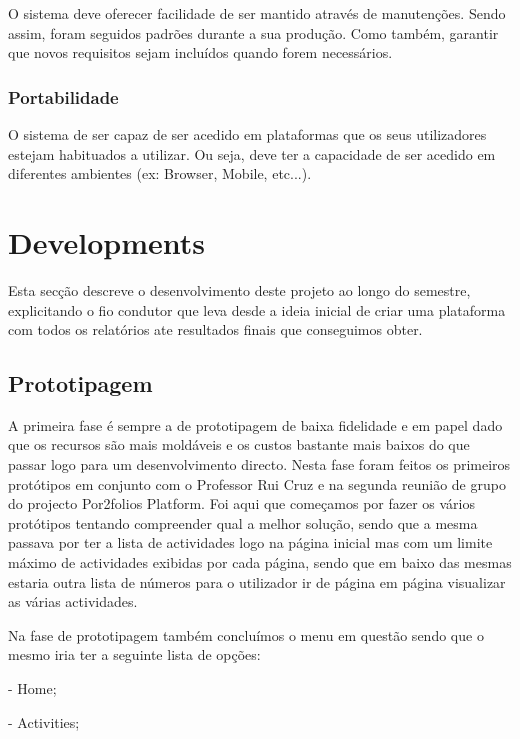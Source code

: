 \documentclass[a4paper,12pt,journal,twoside,compsoc]{PPIEEEtran}
\begin{document}
O sistema deve oferecer facilidade de ser mantido através de manutenções. Sendo assim, foram seguidos padrões durante a sua produção. Como também, garantir que novos requisitos sejam incluídos quando forem necessários.

\subsubsection{Portabilidade}

O sistema de ser capaz de ser acedido em plataformas que os seus utilizadores estejam habituados a utilizar. Ou seja, deve ter a capacidade de ser acedido em diferentes ambientes (ex: Browser, Mobile, etc...). 


\section{Developments}

Esta secção descreve o desenvolvimento deste projeto ao longo do semestre, explicitando o fio condutor que leva desde a ideia inicial de criar uma plataforma com todos os relatórios ate resultados finais que conseguimos obter.

\subsection{Prototipagem}

A primeira fase é sempre a de prototipagem de baixa fidelidade e em papel dado que os recursos são mais moldáveis e os custos bastante mais baixos do que passar logo para um desenvolvimento directo. Nesta fase foram feitos os primeiros protótipos em conjunto com o Professor Rui Cruz e na segunda reunião de grupo do projecto Por2folios Platform. Foi aqui que começamos por fazer os vários protótipos tentando compreender qual a melhor solução, sendo que a mesma passava por ter a lista de actividades logo na página inicial mas com um limite máximo de actividades exibidas por cada página, sendo que em baixo das mesmas estaria outra lista de números para o utilizador ir de página em página visualizar as várias actividades.

Na fase de prototipagem também concluímos o menu em questão sendo que o mesmo iria ter a seguinte lista de opções:

- Home;

- Activities;
\end{document}
